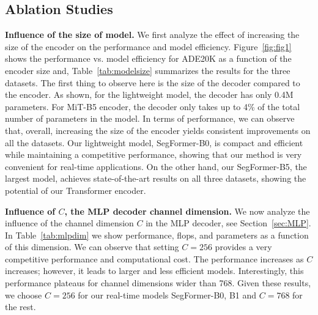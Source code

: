 \subsection{Ablation Studies}
\textbf{Influence of the size of model.}
We first analyze the effect of increasing the size of the encoder on the performance and model efficiency.
Figure~\ref{fig:fig1} shows the performance vs. model efficiency for ADE20K as a function of the encoder size and, Table~\ref{tab:modelsize} summarizes the results for the three datasets. The first thing to observe here is the size of the decoder compared to the encoder. As shown, for the lightweight model, the decoder has only 0.4M parameters. For MiT-B5 encoder, the decoder only takes up to 4\% of the total number of parameters in the model. In terms of performance, we can observe that, overall, increasing the size of the encoder yields consistent improvements on all the datasets. Our lightweight model, SegFormer-B0, is compact and efficient while maintaining a competitive performance, showing that our method is very convenient for real-time applications.  On the other hand, our SegFormer-B5, the largest model, achieves state-of-the-art results on all three datasets, showing the potential of our Transformer encoder.
\begin{table}[!t]
	\vspace{10pt}
	\renewcommand\arraystretch{1.2}
	\setlength{\fboxrule}{0pt}
	\caption{Ablation studies related to model size, encoder and decoder design.}
	\vspace{-10pt}
	\begin{center}
		
	\end{center}
	\vspace{-30pt}
	\label{tab_1}
\end{table}





\textbf{Influence of $C$, the MLP decoder channel dimension.}
We now analyze the influence of the channel dimension $C$ in the MLP decoder, see Section~\ref{sec:MLP}. In Table~\ref{tab:mlpdim} we show performance, flops, and parameters as a function of this dimension. We can observe that setting $C=256$ provides a very competitive performance and computational cost. The performance increases as $C$ increases; however, it leads to larger and less efficient models. Interestingly, this performance plateaus for channel dimensions wider than 768. Given these results, we choose $C=256$ for our real-time models SegFormer-B0, B1 and $C=768$ for the rest.



